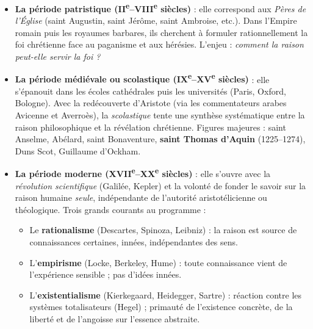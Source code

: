 \documentclass[11pt]{article}
\begin{document}
\begin{itemize}
    \item \textbf{La période patristique (II\textsuperscript{e}--VIII\textsuperscript{e} siècles)} : elle correspond aux \emph{Pères de l'Église} (saint Augustin, saint Jérôme, saint Ambroise, etc.). Dans l'Empire romain puis les royaumes barbares, ils cherchent à formuler rationnellement la foi chrétienne face au paganisme et aux hérésies. L'enjeu : \emph{comment la raison peut-elle servir la foi ?}
    \item \textbf{La période médiévale ou scolastique (IX\textsuperscript{e}--XV\textsuperscript{e} siècles)} : elle s'épanouit dans les écoles cathédrales puis les universités (Paris, Oxford, Bologne). Avec la redécouverte d'Aristote (via les commentateurs arabes Avicenne et Averroès), la \emph{scolastique} tente une synthèse systématique entre la raison philosophique et la révélation chrétienne. Figures majeures : saint Anselme, Abélard, saint Bonaventure, \textbf{saint Thomas d'Aquin} (1225--1274), Duns Scot, Guillaume d'Ockham.
    \item \textbf{La période moderne (XVII\textsuperscript{e}--XX\textsuperscript{e} siècles)} : elle s'ouvre avec la \emph{révolution scientifique} (Galilée, Kepler) et la volonté de fonder le savoir sur la raison humaine \emph{seule}, indépendante de l'autorité aristotélicienne ou théologique. Trois grands courants au programme :
    \begin{itemize}
        \item Le \textbf{rationalisme} (Descartes, Spinoza, Leibniz) : la raison est source de connaissances certaines, innées, indépendantes des sens.
        \item L'\textbf{empirisme} (Locke, Berkeley, Hume) : toute connaissance vient de l'expérience sensible ; pas d'idées innées.
        \item L'\textbf{existentialisme} (Kierkegaard, Heidegger, Sartre) : réaction contre les systèmes totalisateurs (Hegel) ; primauté de l'existence concrète, de la liberté et de l'angoisse sur l'essence abstraite.
    \end{itemize}
\end{itemize}
\end{document}
